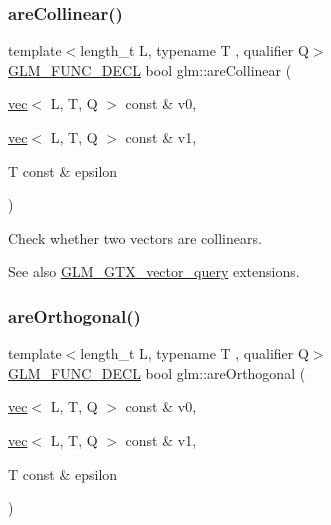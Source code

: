 \subsubsection{\texorpdfstring{are\+Collinear()}{areCollinear()}}
{\footnotesize\ttfamily template$<$length\+\_\+t L, typename T , qualifier Q$>$ \\
\mbox{\hyperlink{setup_8hpp_ab2d052de21a70539923e9bcbf6e83a51}{G\+L\+M\+\_\+\+F\+U\+N\+C\+\_\+\+D\+E\+CL}} bool glm\+::are\+Collinear (\begin{DoxyParamCaption}\item[{\mbox{\hyperlink{structglm_1_1vec}{vec}}$<$ L, T, Q $>$ const \&}]{v0,  }\item[{\mbox{\hyperlink{structglm_1_1vec}{vec}}$<$ L, T, Q $>$ const \&}]{v1,  }\item[{T const \&}]{epsilon }\end{DoxyParamCaption})}

Check whether two vectors are collinears. \begin{DoxySeeAlso}{See also}
\mbox{\hyperlink{group__gtx__vector__query}{G\+L\+M\+\_\+\+G\+T\+X\+\_\+vector\+\_\+query}} extensions. 
\end{DoxySeeAlso}
\mbox{\label{group__gtx__vector__query_gac7b95b3f798e3c293262b2bdaad47c57}} 
\subsubsection{\texorpdfstring{are\+Orthogonal()}{areOrthogonal()}}
{\footnotesize\ttfamily template$<$length\+\_\+t L, typename T , qualifier Q$>$ \\
\mbox{\hyperlink{setup_8hpp_ab2d052de21a70539923e9bcbf6e83a51}{G\+L\+M\+\_\+\+F\+U\+N\+C\+\_\+\+D\+E\+CL}} bool glm\+::are\+Orthogonal (\begin{DoxyParamCaption}\item[{\mbox{\hyperlink{structglm_1_1vec}{vec}}$<$ L, T, Q $>$ const \&}]{v0,  }\item[{\mbox{\hyperlink{structglm_1_1vec}{vec}}$<$ L, T, Q $>$ const \&}]{v1,  }\item[{T const \&}]{epsilon }\end{DoxyParamCaption})}

